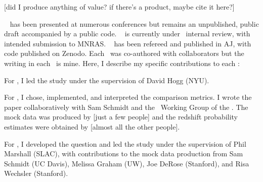 \clearpage

[did I produce anything of value? if there's a product, maybe cite it here?]

\chapname~ has been presented at numerous conferences but remains an unpublished, public draft accompanied by a public code.
\chapname~ is currently under \desc\ internal review, with intended submission to MNRAS.
\chapname~ has been refereed and published in AJ, with code published on Zenodo.
Each \chapname\ was co-authored with collaborators but the writing in each \chapname\ is mine.
Here, I describe my specific contributions to each \chapname:
\begin{enumerate}

{\item For , I led the study under the supervision of David Hogg (NYU).}

{\item For , I chose, implemented, and interpreted the comparison metrics.
	I wrote the paper collaboratively with Sam Schmidt and the \Pz\ Working Group of the \desc.
	The mock data was produced by [just a few people] and the redshift probability estimates were obtained by [almost all the other people].}

{\item For , I developed the question and led the study under the supervision of Phil Marshall (SLAC), with contributions to the mock data production from Sam Schmidt (UC Davis), Melissa Graham (UW), Joe DeRose (Stanford), and Risa Wechsler (Stanford).}

\end{enumerate}
